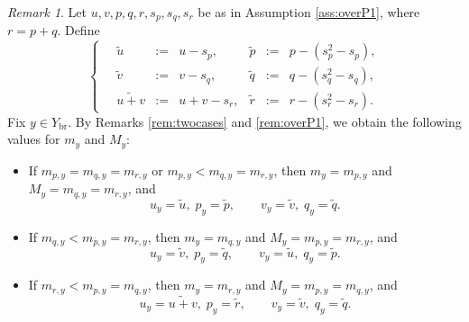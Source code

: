 \documentclass{amsart}
\numberwithin{equation}{section}
\numberwithin{table}{section}
\theoremstyle{plain}
\theoremstyle{definition}
\theoremstyle{remark}
\newtheorem{remark}[theorem]{Remark}
\begin{document}
\begin{remark}
\label{rem:needoverP1}
Let $u,v,p,q,r,s_p,s_q,s_r$ be as in Assumption \ref{ass:overP1}, where $r=p+q$. Define
\begin{equation}
\label{eq:yikes}
\left\{ \quad\begin{array}{lcllcl}
\widetilde{u}&:=&u-s_p, & \widetilde{p}&:=&p-(s_p^2-s_p),\\
\widetilde{v}&:=&v-s_q, & \widetilde{q}&:=&q-(s_q^2-s_q),\\
\widetilde{u+v}&:=&u+v-s_r, & \widetilde{r}&:=&r-(s_r^2-s_r) .
\end{array}\right.
\end{equation}
Fix $y\in Y_{\mathrm{br}}$. By Remarks \ref{rem:twocases} and \ref{rem:overP1}, we obtain the following values for $m_y$ and $M_y$:
\begin{itemize}
\item
If $m_{p,y}= m_{q,y}=m_{r,y}$ or $m_{p,y}< m_{q,y}=m_{r,y}$, then $m_y=m_{p,y}$ and $M_y=m_{q,y}=m_{r,y}$, and
$$u_y=\widetilde{u}, \; p_y=\widetilde{p}, \qquad v_y=\widetilde{v}, \; q_y=\widetilde{q}.$$
\item
If $m_{q,y}< m_{p,y}=m_{r,y}$, then $m_y=m_{q,y}$ and $M_y=m_{p,y}=m_{r,y}$, and
$$u_y=\widetilde{v}, \; p_y=\widetilde{q}, \qquad v_y=\widetilde{u}, \; q_y=\widetilde{p}.$$
\item
If $m_{r,y}< m_{p,y}=m_{q,y}$, then $m_y=m_{r,y}$ and $M_y=m_{p,y}=m_{q,y}$, and
$$u_y=\widetilde{u+v}, \; p_y=\widetilde{r}, \qquad v_y=\widetilde{v}, \; q_y=\widetilde{q}.$$
\end{itemize}
\end{remark}
\end{document}
